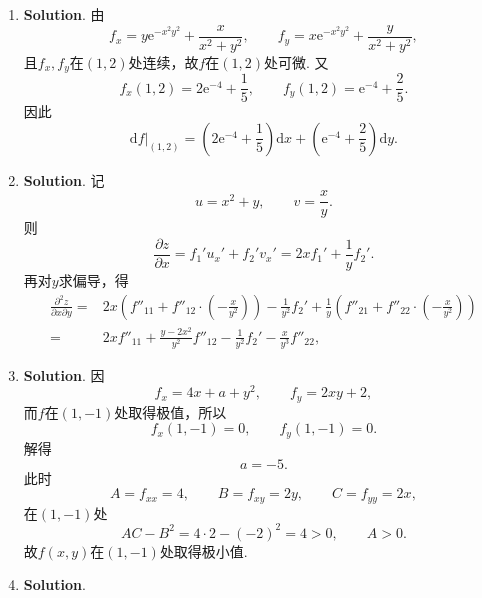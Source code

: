 \documentclass[../main.tex]{subfiles}
\begin{document}
\begin{enumerate}
    \item \textbf{Solution}. 由
          \[
              f_x=y\mathrm{e}^{-x^2y^2}+\frac{x}{x^2+y^2},\qquad
              f_y=x\mathrm{e}^{-x^2y^2}+\frac{y}{x^2+y^2},
          \]
          且$f_x,f_y$在$(1,2)$处连续，故$f$在$(1,2)$处可微. 又
          \[
              f_x(1,2)=2\mathrm{e}^{-4}+\frac15,\qquad
              f_y(1,2)=\mathrm{e}^{-4}+\frac25.
          \]
          因此
          \[
              \mathrm{d}f|_{(1,2)}=\left(2\mathrm{e}^{-4}+\frac15\right)\mathrm{d}x+
              \left(\mathrm{e}^{-4}+\frac25\right)\mathrm{d}y.
          \]

    \item \textbf{Solution}. 记
          \[
              u=x^2+y,\qquad v=\frac{x}{y}.
          \]
          则
          \[
              \frac{\partial z}{\partial x}=f_1'u_x'+f_2'v_x'=2xf_1'+\frac1y f_2'.
          \]
          再对$y$求偏导，得
          \[
              \begin{aligned}
                  \frac{\partial^2 z}{\partial x\partial y}= {} & 2x\left(f''_{11}+f''_{12}\cdot\left(-\frac{x}{y^2}\right)\right)-\frac{1}{y^2}f_2'+\frac{1}{y}\left(f''_{21}+f''_{22}\cdot\left(-\frac{x}{y^2}\right)\right) \\
                  = {}                                          & 2xf''_{11}+\frac{y-2x^2}{y^2}f''_{12}-\frac1{y^2}f_2'-\frac{x}{y^3}f''_{22},
              \end{aligned}
          \]

    \item \textbf{Solution}. 因
          \[
              f_x=4x+a+y^2,\qquad f_y=2xy+2,
          \]
          而$f$在$(1,-1)$处取得极值，所以
          \[
              f_x(1,-1)=0,\qquad f_y(1,-1)=0.
          \]
          解得
          \[
              a=-5.
          \]
          此时
          \[
              A=f_{xx}=4,\qquad B=f_{xy}=2y,\qquad C=f_{yy}=2x,
          \]
          在$(1,-1)$处
          \[
              AC-B^2=4\cdot2-(-2)^2=4>0,\qquad A>0.
          \]
          故$f(x,y)$在$(1,-1)$处取得极小值.

    \item \textbf{Solution}.


\end{enumerate}
\end{document}
